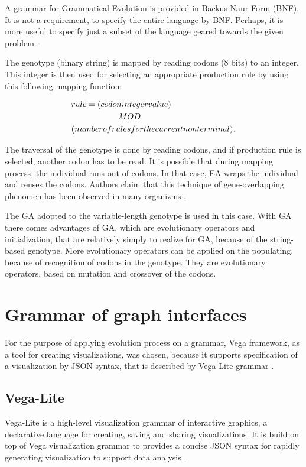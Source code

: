 
A grammar for Grammatical Evolution is provided in Backus-Naur Form (BNF). It is not a requirement, to specify the entire language by BNF. Perhaps, it is more useful to specify just a subset of the language geared towards the given problem \cite{grammatical-evolution}.

The genotype (binary string) is mapped by reading codons (8 bits) to an integer. This integer is then used for selecting an appropriate production rule by using this following mapping function:

\begin{align*}
  &rule = (codon integer value)\\
  &\hspace{20 mm} MOD\\
  &(number of rules for the current nonterminal).
\end{align*}

The traversal of the genotype is done by reading codons, and if production rule is selected, another codon has to be read. It is possible that during mapping process, the individual runs out of codons. In that case, EA wraps the individual and reuses the codons. Authors claim that this technique of gene-overlapping phenomen has been observed in many organizms \cite{grammatical-evolution}.

The GA adopted to the variable-length genotype is used in this case. With GA there comes advantages of GA, which are evolutionary operators and initialization, that are relatively simply to realize for GA, because of the string-based genotype. More evolutionary operators can be applied on the populating, because of recognition of codons in the genotype. They are evolutionary operators, based on mutation and crossover of the codons\cite{grammatical-evolution}.

\section{Grammar of graph interfaces}
For the purpose of applying evolution process on a grammar, Vega \cite{vega-not-lite} framework, as a tool for creating visualizations, was chosen, because it supports specification of a visualization by JSON syntax, that is described by Vega-Lite grammar \cite{vega}.
\subsection{Vega-Lite}
  Vega-Lite is a high-level visualization grammar of interactive graphics, a declarative language for creating, saving and sharing visualizations. It is build on top of Vega visualization grammar to provides a concise JSON syntax for rapidly generating visualization to support data analysis \cite{vega}.

